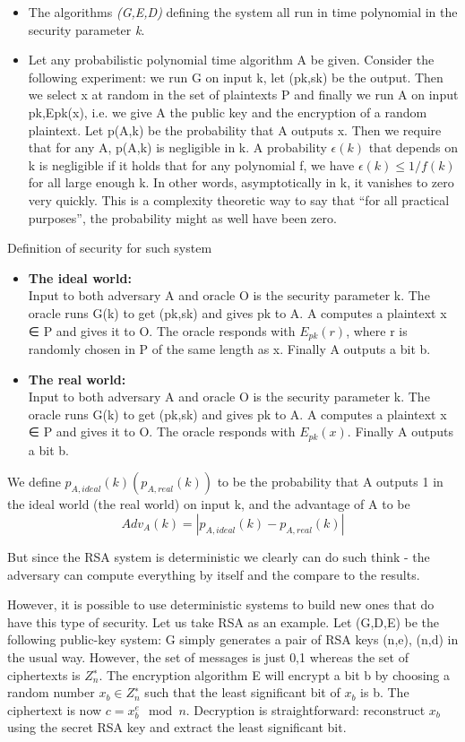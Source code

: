 \documentclass[a4paper,10pt]{article}
\begin{document}
\begin{itemize}
\item
The algorithms \textit{(G,E,D)} defining the system all run in time polynomial in the security parameter \textit{k}.
\item 
Let any probabilistic polynomial time algorithm A be given. Consider the following experiment:
we run G on input k, let (pk,sk) be the output. Then we select x at random in the set of
plaintexts P and finally we run A on input pk,Epk(x), i.e. we give A the public key and the
encryption of a random plaintext. Let p(A,k) be the probability that A outputs x. Then we
require that for any A, p(A,k) is negligible in k.
A probability $\epsilon(k)$ that depends on k is negligible if it holds that for any polynomial f, we have
$\epsilon(k) ≤ 1/f(k)$ for all large enough k. In other words, asymptotically in k, it vanishes to zero
very quickly. This is a complexity theoretic way to say that “for all practical purposes”, the
probability might as well have been zero.
\end{itemize}
Definition of security for such system
\begin{itemize}
\item[] \textbf{The ideal world:}\\
Input to both adversary A and oracle O is the security parameter k. The oracle runs G(k) to get (pk,sk) and gives pk to A. A computes a plaintext x ∈ P and gives it to O. The oracle responds with $E_{pk}(r)$, where r is randomly chosen in P of the same length as x.
Finally A outputs a bit b.

\item[] \textbf{The real world:}\\
Input to both adversary A and oracle O is the security parameter k. The oracle runs G(k) to get (pk,sk) and gives pk to A. A computes a plaintext x ∈ P and gives it to O.
The oracle responds with $E_{pk}(x)$. Finally A outputs a bit b.	
\end{itemize}
We define $p_{A,ideal}(k) (p_{A,real}(k))$ to be the probability that A outputs 1 in the ideal world (the real world) on input k, and the advantage of A to be
$$
Adv_A(k) = |p_{A,ideal}(k) - p_{A,real}(k)|
$$

But since the RSA system is deterministic we clearly can do such think - the adversary can compute everything by itself and the compare to the results.

However, it is possible to use deterministic systems to build new ones that do have this type
of security. Let us take RSA as an example. Let (G,D,E) be the following public-key system: G
simply generates a pair of RSA keys (n,e), (n,d) in the usual way. However, the set of messages
is just {0,1} whereas the set of ciphertexts is $Z^{∗}_n$. The encryption algorithm E will encrypt a bit b
by choosing a random number $x_b \in Z^{∗}_n$ such that the least significant bit of $x_b$ is b. The ciphertext is now $c = x^e_b \mod n$. Decryption is straightforward: reconstruct $x_b$ using the secret RSA key and extract the least significant bit.
\end{document}
